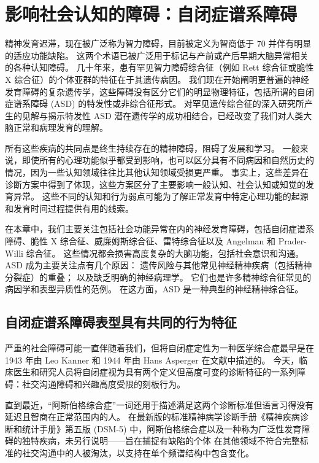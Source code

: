 \chapter{影响社会认知的障碍：自闭症谱系障碍}

精神发育迟滞，现在被广泛称为智力障碍，目前被定义为智商低于 70 并伴有明显的适应功能缺陷。 这两个术语已被广泛用于标记与产前或产后早期大脑异常相关的各种认知障碍。 几十年来，患有罕见智力障碍综合征（例如 Rett 综合征或脆性 X 综合征）的个体亚群的特征在于其遗传病因。 我们现在开始阐明更普遍的神经发育障碍的复杂遗传学，这些障碍没有区分它们的明显物理特征，包括所谓的自闭症谱系障碍 (ASD) 的特发性或非综合征形式。 对罕见遗传综合征的深入研究所产生的见解与揭示特发性 ASD 潜在遗传学的成功相结合，已经改变了我们对人类大脑正常和病理发育的理解。

所有这些疾病的共同点是终生持续存在的精神障碍，阻碍了发展和学习。 一般来说，即使所有的心理功能似乎都受到影响，也可以区分具有不同病因和自然历史的情况，因为一些认知领域往往比其他认知领域受损更严重。 事实上，这些差异在诊断方案中得到了体现，这些方案区分了主要影响一般认知、社会认知或知觉的发育异常。 这些不同的认知和行为弱点可能为了解正常发育中特定心理功能的起源和发育时间过程提供有用的线索。

在本章中，我们主要关注包括社会功能异常在内的神经发育障碍，包括自闭症谱系障碍、脆性 X 综合征、威廉姆斯综合征、雷特综合征以及 Angelman 和 Prader-Willi 综合征。 这些情况都会损害高度复杂的大脑功能，包括社会意识和沟通。 ASD 成为主要关注点有几个原因： 遗传风险与其他常见神经精神疾病（包括精神分裂症）的重叠； 以及缺乏明确的神经病理学。 它们也是许多精神综合征常见的病因学和表型异质性的范例。 在这方面，ASD 是一种典型的神经精神综合征。

\section{自闭症谱系障碍表型具有共同的行为特征}

严重的社会障碍可能一直伴随着我们，但将自闭症定性为一种医学综合症最早是在 1943 年由 Leo Kanner 和 1944 年由 Hans Asperger 在文献中描述的。 今天，临床医生和研究人员将自闭症视为具有两个定义但高度可变的诊断特征的一系列障碍：社交沟通障碍和兴趣高度受限的刻板行为。

直到最近，“阿斯伯格综合症”一词还用于描述满足这两个诊断标准但语言习得没有延迟且智商在正常范围内的人。 在最新版的标准精神病学诊断手册《精神疾病诊断和统计手册》第五版 (DSM-5) 中，阿斯伯格综合症以及一种称为广泛性发育障碍的独特疾病，未另行说明——旨在捕捉有缺陷的个体 在其他领域不符合完整标准的社交沟通中的人被淘汰，以支持在单个频谱结构中包含变化。


